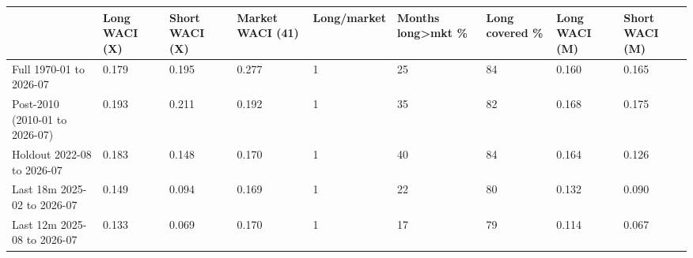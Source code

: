 \begin{tabular}{lllllllll}
\toprule
 & Long WACI (X) & Short WACI (X) & Market WACI (41) & Long/market & Months long>mkt \% & Long covered \% & Long WACI (M) & Short WACI (M) \\
\midrule
Full 1970-01 to 2026-07 & 0.179 & 0.195 & 0.277 & 1 & 25 & 84 & 0.160 & 0.165 \\
Post-2010 (2010-01 to 2026-07) & 0.193 & 0.211 & 0.192 & 1 & 35 & 82 & 0.168 & 0.175 \\
Holdout 2022-08 to 2026-07 & 0.183 & 0.148 & 0.170 & 1 & 40 & 84 & 0.164 & 0.126 \\
Last 18m 2025-02 to 2026-07 & 0.149 & 0.094 & 0.169 & 1 & 22 & 80 & 0.132 & 0.090 \\
Last 12m 2025-08 to 2026-07 & 0.133 & 0.069 & 0.170 & 1 & 17 & 79 & 0.114 & 0.067 \\
\bottomrule
\end{tabular}
